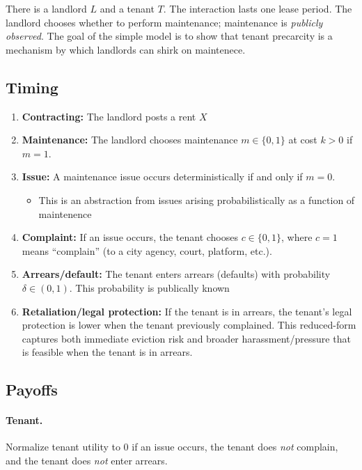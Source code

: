 \documentclass[11pt]{article}
\begin{document}
There is a landlord $L$ and a tenant $T$. The interaction lasts one lease period. The landlord chooses whether to perform maintenance; maintenance is \emph{publicly observed}. The goal of the simple model is to show that tenant precarcity is a mechanism by which landlords can shirk on maintenece.

\subsection{Timing}

\begin{enumerate}
  \item \textbf{Contracting:} The landlord posts a rent $X$
  \item \textbf{Maintenance:} The landlord chooses maintenance $m \in \{0,1\}$ at cost $k>0$ if $m=1$.
  \item \textbf{Issue:} A maintenance issue occurs deterministically if and only if $m=0$.
    \begin{itemize}
      \item This is an abstraction from issues arising probabilistically as a function of maintenence
    \end{itemize}
  \item \textbf{Complaint:} If an issue occurs, the tenant chooses $c \in \{0,1\}$, where $c=1$ means ``complain'' (to a city agency, court, platform, etc.).
  \item \textbf{Arrears/default:} The tenant enters arrears (defaults) with probability $\delta \in (0,1)$. This probability is publically known
  \item \textbf{Retaliation/legal protection:} If the tenant is in arrears, the tenant's legal protection is lower when the tenant previously complained. This reduced-form captures both immediate eviction risk and broader harassment/pressure that is feasible when the tenant is in arrears.
\end{enumerate}

\subsection{Payoffs}

\paragraph{Tenant.}
Normalize tenant utility to $0$ if an issue occurs, the tenant does \emph{not} complain, and the tenant does \emph{not} enter arrears.
\end{document}
